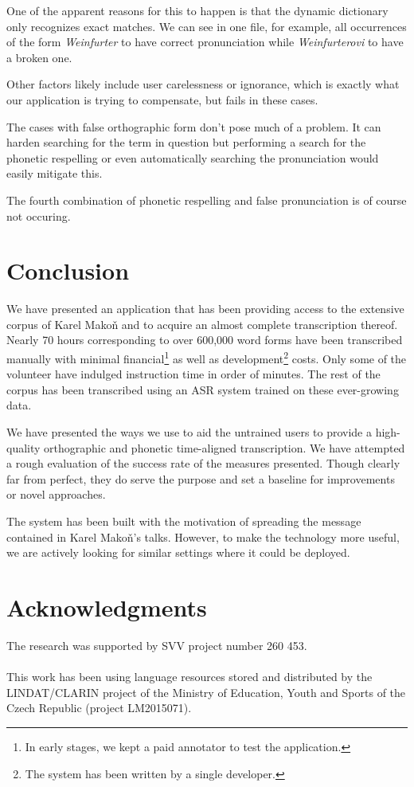 \documentclass{itatnew}
\begin{document}
One of the apparent reasons for this to happen is that the dynamic dictionary
only recognizes exact matches. We can see in one file, for example, all
occurrences of the form {\em Weinfurter} to have correct pronunciation while
{\em Weinfurterovi} to have a broken one.

Other factors likely include user carelessness or ignorance, which is
exactly what our application is trying to compensate, but fails in these cases.

The cases with false orthographic form don't pose much of a problem. It can
harden searching for the term in question but performing a search for the
phonetic respelling or even automatically searching the pronunciation would
easily mitigate this.

The fourth combination of phonetic respelling and false pronunciation is of
course not occuring.

\section{Conclusion}

We have presented an application that has been providing access to the
extensive corpus of Karel Makoň and to acquire an almost complete transcription
thereof. Nearly 70 hours corresponding to over 600,000 word forms have been
transcribed manually with minimal financial\footnote{In early stages, we kept a paid
annotator to test the application.} as well as development\footnote{The system
has been written by a single developer.} costs. Only some of the volunteer have
indulged instruction time in order of minutes. The rest of the corpus has been
transcribed using an ASR system trained on these ever-growing data.

We have presented the ways we use to aid the untrained users to provide a
high-quality orthographic and phonetic time-aligned transcription. We have
attempted a rough evaluation of the success rate of the measures presented.
Though clearly far from perfect, they do serve the purpose and set a baseline
for improvements or novel approaches.

The system has been built with the motivation of spreading the message contained
in Karel Makoň's talks. However, to make the technology more useful, we are
actively looking for similar settings where it could be deployed.

\section*{Acknowledgments}

The research was supported by SVV project number 260 453.\\
\\
This work has been using language resources stored
and distributed  by the LINDAT/CLARIN project of the Ministry of Education,
Youth and Sports of the Czech Republic (project LM2015071).



\end{document}
